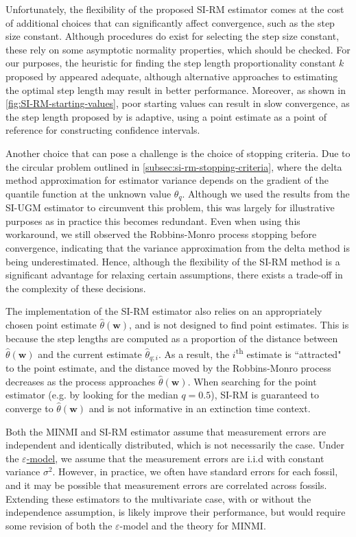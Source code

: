 Unfortunately, the flexibility of the proposed SI-RM estimator comes at the cost of additional choices that can significantly affect convergence, such as the step size constant. Although procedures do exist for selecting the step size constant, these rely on some asymptotic normality properties, which should be checked. For our purposes, the heuristic for finding the step length proportionality constant $k$ proposed by \citet{Garthwaite1992} appeared adequate, although alternative approaches to estimating the optimal step length may result in better performance. Moreover, as shown in \autoref{fig:SI-RM-starting-values}, poor starting values can result in slow convergence, as the step length proposed by \citet{Garthwaite1992} is adaptive, using a point estimate as a point of reference for constructing confidence intervals. 

Another choice that can pose a challenge is the choice of stopping criteria. Due to the circular problem outlined in \autoref{subsec:si-rm-stopping-criteria}, where the delta method approximation for estimator variance depends on the gradient of the quantile function at the unknown value $\theta_q$. Although we used the results from the SI-UGM estimator to circumvent this problem, this was largely for illustrative purposes as in practice this becomes redundant. Even when using this workaround, we still observed the Robbins-Monro process stopping before convergence, indicating that the variance approximation from the delta method is being underestimated. Hence, although the flexibility of the SI-RM method is a significant advantage for relaxing certain assumptions, there exists a trade-off in the complexity of these decisions.

The implementation of the SI-RM estimator also relies on an appropriately chosen point estimate $\hat\theta(\bm{w})$, and is not designed to find point estimates. This is because the step lengths are computed as a proportion of the distance between $\hat\theta(\bm{w})$ and the current estimate $\hat\theta_{q; i}$. As a result, the $i$\textsuperscript{th} estimate is ``attracted" to the point estimate, and the distance moved by the Robbins-Monro process decreases as the process approaches $\hat\theta(\bm{w})$. When searching for the point estimator (e.g. by looking for the median $q=0.5$), SI-RM is guaranteed to converge to $\hat\theta(\bm{w})$ and is not informative in an extinction time context.

Both the MINMI and SI-RM estimator assume that measurement errors are independent and identically distributed, which is not necessarily the case. Under the \hyperref[model: measurement-error]{$\varepsilon$-model}, we assume that the measurement errors are i.i.d with constant variance $\sigma^2$. However, in practice, we often have standard errors for each fossil, and it may be possible that measurement errors are correlated across fossils. Extending these estimators to the multivariate case, with or without the independence assumption, is likely improve their performance, but would require some revision of both the $\varepsilon$-model and the theory for MINMI.


